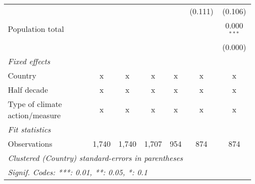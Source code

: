 \begin{tabular}{lcccccc}
                                            &               &              &         &         & (0.111) & (0.106)\\   
   Population total                         &               &              &         &         &         & 0.000$^{***}$\\   
                                            &               &              &         &         &         & (0.000)\\   
   \emph{Fixed effects}\\
   Country                                  & x             & x            & x       & x       & x       & x\\  
   Half decade                              & x             & x            & x       & x       & x       & x\\  
   Type of climate action/measure           & x             & x            & x       & x       & x       & x\\  
   \midrule \emph{Fit statistics}\\
   Observations                             & 1,740         & 1,740        & 1,707   & 954     & 874     & 874\\  
   \midrule
   \multicolumn{7}{l}{\emph{Clustered (Country) standard-errors in parentheses}}\\
   \multicolumn{7}{l}{\emph{Signif. Codes: ***: 0.01, **: 0.05, *: 0.1}}\\
\end{tabular}
\par\endgroup


